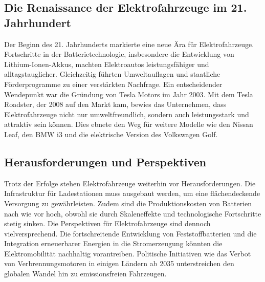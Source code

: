 \subsection*{Die Renaissance der Elektrofahrzeuge im 21. Jahrhundert}
Der Beginn des 21. Jahrhunderts markierte eine neue Ära für Elektrofahrzeuge. Fortschritte in der Batterietechnologie, insbesondere die Entwicklung von Lithium-Ionen-Akkus, machten Elektroautos leistungsfähiger und alltagstauglicher. \autocite{sonepar_batterien_2023} Gleichzeitig führten Umweltauflagen und staatliche Förderprogramme zu einer verstärkten Nachfrage.\newline
Ein entscheidender Wendepunkt war die Gründung von Tesla Motors im Jahr 2003. Mit dem Tesla Roadster, der 2008 auf den Markt kam, bewies das Unternehmen, dass Elektrofahrzeuge nicht nur umweltfreundlich, sondern auch leistungsstark und attraktiv sein können. Dies ebnete den Weg für weitere Modelle wie den Nissan Leaf, den BMW i3 und die elektrische Version des Volkswagen Golf. \autocite{insidetesla_tesla_geschichte}

\subsection*{Herausforderungen und Perspektiven}
Trotz der Erfolge stehen Elektrofahrzeuge weiterhin vor Herausforderungen.  Die Infrastruktur für Ladestationen muss ausgebaut werden, um eine flächendeckende Versorgung zu gewährleisten. \autocite{statista_ladeinfrastruktur_elektroautos} Zudem sind die Produktionskosten von Batterien nach wie vor hoch, obwohl sie durch Skaleneffekte und technologische Fortschritte stetig sinken. \autocite{automobilproduktion_produktionskosten_elektroautos} \newline
Die Perspektiven für Elektrofahrzeuge sind dennoch vielversprechend. Die fortschreitende Entwicklung von Feststoffbatterien und die Integration erneuerbarer Energien in die Stromerzeugung könnten die Elektromobilität nachhaltig vorantreiben. Politische Initiativen wie das Verbot von Verbrennungsmotoren in einigen Ländern ab 2035 unterstreichen den globalen Wandel hin zu emissionsfreien Fahrzeugen. \autocite{fraunhofer_batterie_rohstoffe}


